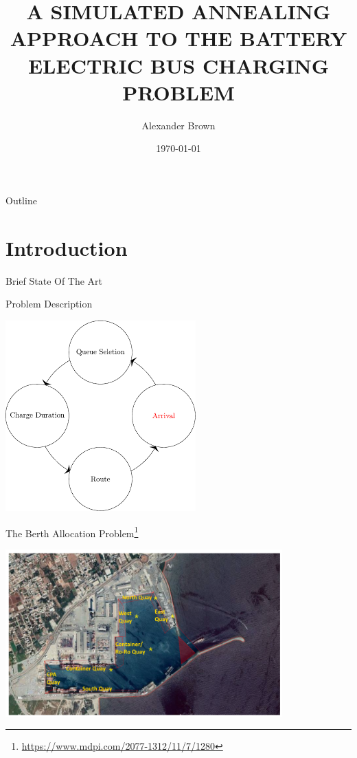\documentclass[aspectratio=169]{beamer}
\institute[USU] %
{
College of Engineering\\
Utah State University
}
\author{Alexander Brown}
\date{\today}
\title{A SIMULATED ANNEALING APPROACH TO THE BATTERY ELECTRIC BUS CHARGING PROBLEM}
\begin{document}
\maketitle
\begin{frame}{Outline}
\tableofcontents
\end{frame}


\section{Introduction}
\label{sec:orgd379458}
\begin{frame}[label={sec:org0c013cc}]{Brief State Of The Art}
\end{frame}
\begin{frame}[label={sec:orgb7c8415}]{Problem Description}
\begin{center}
\includegraphics[width=0.55\textwidth]{./img/visit.pdf}
\end{center}
\end{frame}

\begin{frame}[label={sec:orgb918779}]{The Berth Allocation Problem\footnote{\url{https://www.mdpi.com/2077-1312/11/7/1280}}}
\begin{center}
\includegraphics[width=0.8\textwidth]{./img/berthing-sky-picture.png}
\end{center}
\end{frame}
\end{document}

